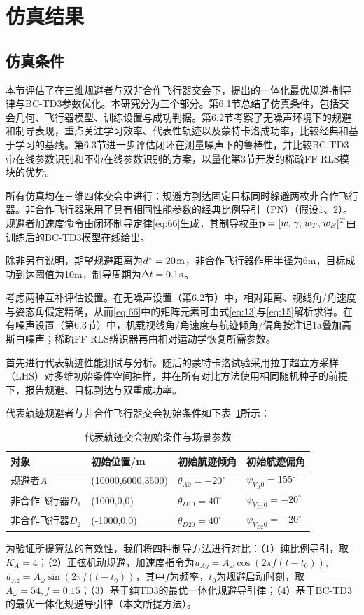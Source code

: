 \section{仿真结果}
\subsection{仿真条件}
本节评估了在三维规避者与双非合作飞行器交会下，提出的一体化最优规避-制导律与BC-TD3参数优化。本研究分为三个部分。第6.1节总结了仿真条件，包括交会几何、飞行器模型、训练设置与成功判据。第6.2节考察了无噪声环境下的规避和制导表现，重点关注学习效率、代表性轨迹以及蒙特卡洛成功率，比较经典和基于学习的基线。第6.3节进一步评估闭环在测量噪声下的鲁棒性，并比较BC-TD3带在线参数识别和不带在线参数识别的方案，以量化第3节开发的稀疏FF-RLS模块的优势。

所有仿真均在三维四体交会中进行：规避方到达固定目标同时躲避两枚非合作飞行器。非合作飞行器采用了具有相同性能参数的经典比例导引（PN）（假设1、2）。规避者加速度命令由闭环制导定律\eqref{eq:66}生成，其制导权重${\mathbf{p}} = {[w,{\kern 1pt} \gamma ,{\kern 1pt} {w_T},{\kern 1pt} {w_E}]^T}$由训练后的BC-TD3模型在线给出。

除非另有说明，期望规避距离为${d^*} = 20{\kern 1pt} {\text{m}}$，非合作飞行器作用半径为6m，目标成功到达阈值为10m，制导周期为$\Delta t = 0.1{\kern 1pt} {\text{s}}$。

考虑两种互补评估设置。在无噪声设置（第6.2节）中，相对距离、视线角/角速度与姿态角假定精确，从而\eqref{eq:66}中的矩阵元素可由式\eqref{eq:13}与\eqref{eq:15}解析求得。在有噪声设置（第6.3节）中，机载视线角/角速度与航迹倾角/偏角按注记1a叠加高斯白噪声；稀疏FF-RLS辨识器再由相对运动学恢复所需参数。

首先进行代表轨迹性能测试与分析。随后的蒙特卡洛试验采用拉丁超立方采样（LHS）对多维初始条件空间抽样，并在所有对比方法使用相同随机种子的前提下，报告规避、目标到达与双重成功率。

代表轨迹规避者与非合作飞行器交会初始条件如下表~\ref{tab:init-traj}所示：

\begin{table}[htbp]
\centering
\caption{代表轨迹交会初始条件与场景参数}
\label{tab:init-traj}
\small
\begin{tabularx}{\linewidth}{lXXX}
\toprule
对象 & 初始位置/m & 初始航迹倾角 & 初始航迹偏角 \\
\midrule
规避者$A$ & (10000,6000,3500) & ${\theta _{A0}} =  - {20^ \circ }$ & ${\psi _{{V_A}0}} = {155^ \circ }$ \\
非合作飞行器${D_1}$ & (1000,0,0) & ${\theta _{D10}} = {40^ \circ }$ & ${\psi _{{V_{D1}}0}} =  - {20^ \circ }$ \\
非合作飞行器${D_2}$ & (-1000,0,0) & ${\theta _{D20}} = {40^ \circ }$ & ${\psi _{{V_{D2}}0}} =  - {20^ \circ }$ \\
\bottomrule
\end{tabularx}
\end{table}
为验证所提算法的有效性，我们将四种制导方法进行对比：（1）纯比例导引，取${K_A} = 4$；（2）正弦机动规避，加速度指令为${u_{Ay}} = {A_\omega }\cos (2\pi f(t - {t_0}))$, ${u_{Az}} = {A_\omega }\sin (2\pi f(t - {t_0}))$，其中$f$为频率，${t_0}$为规避启动时刻，取${A_\omega } = 54,f = 0.15$；（3）基于纯TD3的最优一体化规避导引律；（4）基于BC-TD3的最优一体化规避导引律（本文所提方法）。

